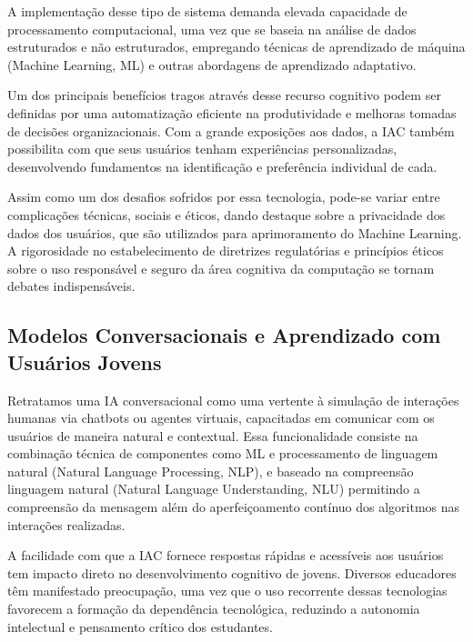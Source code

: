 \documentclass[12pt]{article}
\begin{document}
	A implementação desse tipo de sistema demanda elevada capacidade de processamento computacional, uma vez que se baseia na análise de dados estruturados e não estruturados, empregando técnicas de aprendizado de máquina (Machine Learning, ML) e outras abordagens de aprendizado adaptativo. \cite{stefanini2024}
    

Um dos principais benefícios tragos através desse recurso cognitivo podem ser definidas por uma automatização eficiente na produtividade e melhoras tomadas de decisões organizacionais. Com a grande exposições aos dados, a IAC também possibilita com que seus usuários tenham experiências personalizadas, desenvolvendo fundamentos na identificação e preferência individual de cada. \cite{dataCamp2024}

Assim como um dos desafios sofridos por essa tecnologia, pode-se variar entre complicações técnicas, sociais e éticos, dando destaque sobre a privacidade dos dados dos usuários, que são utilizados para aprimoramento do Machine Learning. A rigorosidade no estabelecimento de diretrizes regulatórias e princípios éticos sobre o uso responsável e seguro da área cognitiva da computação se tornam debates indispensáveis. \cite{dataCamp2024}

\subsection{Modelos Conversacionais e Aprendizado com Usuários Jovens}

 Retratamos uma IA conversacional como uma vertente à simulação de interações humanas via chatbots ou agentes virtuais, capacitadas em comunicar com os usuários de maneira natural e contextual. \cite {ibm2025} Essa funcionalidade consiste na combinação técnica de componentes como ML e processamento de linguagem natural (Natural Language Processing, NLP), e baseado na compreensão linguagem natural (Natural Language Understanding, NLU) permitindo a compreensão da mensagem além do aperfeiçoamento contínuo dos algoritmos nas interações realizadas. 

	

	A facilidade com que a IAC fornece respostas rápidas e acessíveis aos usuários tem impacto direto no desenvolvimento cognitivo de jovens. \cite{jornalCasarao2025} Diversos educadores têm manifestado preocupação, uma vez que o uso recorrente dessas tecnologias favorecem a formação da dependência tecnológica, reduzindo a autonomia intelectual e pensamento crítico dos estudantes. 
   
\end{document}
